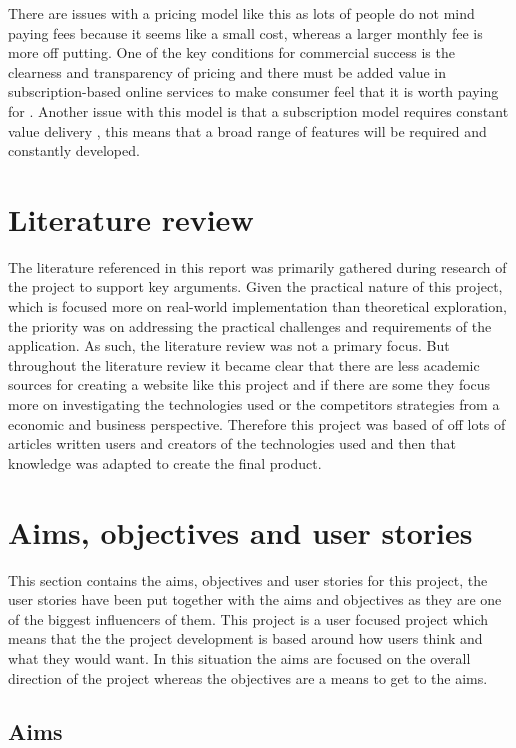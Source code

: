 \documentclass[]{project_report}
\begin{document}
There are issues with a pricing model like this as lots of people do not mind paying fees because it seems like a small cost, whereas a larger monthly fee is more off putting. One of the key conditions for commercial success is the clearness and transparency of pricing \cite{saas_architecture_pricing} and there must be added value in subscription-based online services to make consumer feel that it is worth paying for \cite{fee_based_services}. Another issue with this model is that a subscription model requires constant value delivery \cite{license_vs_subscription_pricing}, this means that a broad range of features will be required and constantly developed.

\section{Literature review} 

The literature referenced in this report was primarily gathered during research of the project to support key arguments. Given the practical nature of this project, which is focused more on real-world implementation than theoretical exploration, the priority was on addressing the practical challenges and requirements of the application. As such, the literature review was not a primary focus. But throughout the literature review it became clear that there are less academic sources for creating a website like this project and if there are some they focus more on investigating the technologies used or the competitors strategies from a economic and business perspective. Therefore this project was based of off lots of articles written users and creators of the technologies used and then that knowledge was adapted to create the final product. 


\section{Aims, objectives and user stories}

This section contains the aims, objectives and user stories for this project, the user stories have been put together with the aims and objectives as they are one of the biggest influencers of them. This project is a user focused project which means that the the project development is based around how users think and what they would want. In this situation the aims are focused on the overall direction of the project whereas the objectives are a means to get to the aims.

\subsection{Aims}
\end{document}
